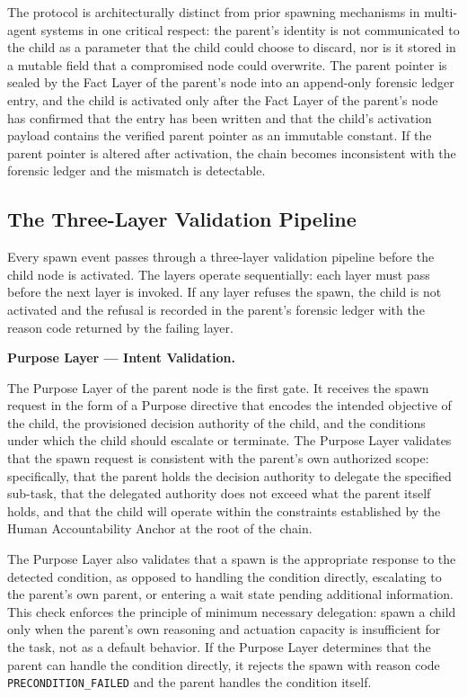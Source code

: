 The protocol is architecturally distinct from prior spawning mechanisms in multi-agent systems in one critical respect: the parent's identity is not communicated to the child as a parameter that the child could choose to discard, nor is it stored in a mutable field that a compromised node could overwrite. The parent pointer is sealed by the Fact Layer of the parent's node into an append-only forensic ledger entry, and the child is activated only after the Fact Layer of the parent's node has confirmed that the entry has been written and that the child's activation payload contains the verified parent pointer as an immutable constant. If the parent pointer is altered after activation, the chain becomes inconsistent with the forensic ledger and the mismatch is detectable.


\subsection{The Three-Layer Validation Pipeline}

Every spawn event passes through a three-layer validation pipeline before the child node is activated. The layers operate sequentially: each layer must pass before the next layer is invoked. If any layer refuses the spawn, the child is not activated and the refusal is recorded in the parent's forensic ledger with the reason code returned by the failing layer.

\bigskip

\noindent\textbf{Purpose Layer — Intent Validation.}

The Purpose Layer of the parent node is the first gate. It receives the spawn request in the form of a Purpose directive that encodes the intended objective of the child, the provisioned decision authority of the child, and the conditions under which the child should escalate or terminate. The Purpose Layer validates that the spawn request is consistent with the parent's own authorized scope: specifically, that the parent holds the decision authority to delegate the specified sub-task, that the delegated authority does not exceed what the parent itself holds, and that the child will operate within the constraints established by the Human Accountability Anchor at the root of the chain.

The Purpose Layer also validates that a spawn is the appropriate response to the detected condition, as opposed to handling the condition directly, escalating to the parent's own parent, or entering a wait state pending additional information. This check enforces the principle of minimum necessary delegation: spawn a child only when the parent's own reasoning and actuation capacity is insufficient for the task, not as a default behavior. If the Purpose Layer determines that the parent can handle the condition directly, it rejects the spawn with reason code \texttt{PRECONDITION\_FAILED} and the parent handles the condition itself.

